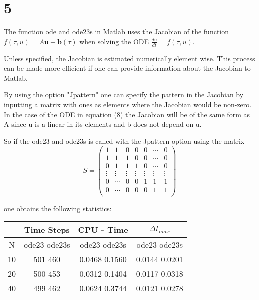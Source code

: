 \documentclass[11pt,a4paper,roman]{scrartcl}
\begin{document}
\section*{5}


The function ode and ode23s in Matlab uses the Jacobian of the function $f(\tau,u)=A\textbf{u}+\textbf{b}(\tau)$ when solving the ODE $\frac{du}{dt}=f(\tau,u)$.

Unless specified, the Jacobian is estimated numerically element wise. This process can be made more efficient if one can provide information about the Jacobian to Matlab.


By using the option "Jpattern" one can specify the pattern in the Jacobian by inputting a matrix with ones as elements where the Jacobian would be non-zero. In the case of the ODE in equation (8) the Jacobian will be of the same form as A since u is a linear in its elements and b does not depend on u. 

So if the ode23 and ode23s is called with the Jpattern option using the matrix 
\begin{equation}
S=
\begin{pmatrix}
  1 &  1  &  0  &  0  &  0  & \cdots & 0 \\
  1  & 1  &  1  &  0  &  0  & \cdots & 0 \\
  0  &  1  & 1  &  1  &  0  & \cdots & 0\\
  \vdots  & \vdots  & \vdots & \vdots & \vdots & \vdots  & \vdots  \\
  0 & \cdots & 0 & 0 & 1 & 1 & 1 \\
  0 & \cdots & 0 & 0 & 0 &  1 &  1\\
 \end{pmatrix}
\end{equation}

one obtains the following statistics:

\begin{table}[h]
\begin{center}
\begin{tabular}{ | c | c | c |c|}
\hline
   & Time Steps    & CPU - Time      & $\Delta t_{max}$  \\ \hline
N  &  ode23 ode23s &  ode23   ode23s &   ode23 ode23s  \\ \hline
10 &   501   460   &  0.0468 0.1560  &  0.0144  0.0201 \\ \hline 20 &   500   453   &  0.0312  0.1404 &  0.0117  0.0318 \\ \hline
40 &   499   462   &  0.0624 0.3744 &  0.0121  0.0278 \\ \hline
\end{tabular}
\end{center}
\label{Statistics for comparison between ode23 and ode23s}
\end{table}
\end{document}
